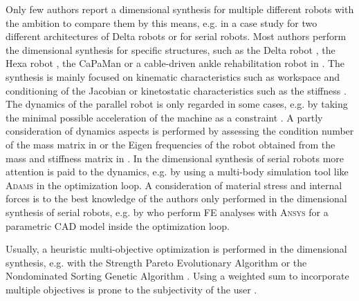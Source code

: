 \documentclass[fleqn,a4paper,10pt]{article}
\begin{document}
\begin{multicols}{2}
Only few authors report a dimensional synthesis for multiple different robots with the ambition to compare them by this means, e.g. \cite{Krefft2006} in a case study for two different architectures of Delta robots or \cite{Ramirez2018} for serial robots.
Most authors perform the dimensional synthesis for specific structures, such as the  Delta robot \cite{StockMil2003,KelaiaiaComZaa2012}, the Hexa robot \cite{Krefft2006}, the CaPaMan \cite{CarboneOttCec2007} or a cable-driven ankle rehabilitation robot in \cite{JamwalHusXie2015}.
The synthesis is mainly focused on kinematic characteristics such as workspace and conditioning of the Jacobian or kinetostatic characteristics such as the stiffness \cite{CarboneOttCec2007,KelaiaiaComZaa2012}. %
The dynamics of the parallel robot is only regarded in some cases, e.g. by taking the minimal possible acceleration of the machine as a constraint \cite{Krefft2006}.
A partly consideration of dynamics aspects is performed by assessing the condition number of the mass matrix in \cite{KelaiaiaComZaa2012} or the Eigen frequencies of the robot obtained from the mass and stiffness matrix in \cite{JamwalHusXie2015}.
In the dimensional synthesis of serial robots more attention is paid to the dynamics, e.g. by \cite{ZhouBaiHan2011} using a multi-body simulation tool like \textsc{Adams} in the optimization loop.
A consideration of material stress and internal forces is to the best knowledge of the authors only performed in the dimensional synthesis of serial robots, e.g. by \cite{ZhouBai2015} who perform FE analyses with \textsc{Ansys} for a parametric CAD model inside the optimization loop.

Usually, a heuristic multi-objective optimization is performed in the dimensional synthesis, e.g. with the Strength Pareto Evolutionary Algorithm \cite{Krefft2006,KelaiaiaComZaa2012} or the Nondominated Sorting Genetic Algorithm \cite{JamwalHusXie2015}.
Using a weighted sum to incorporate multiple objectives is prone to the subjectivity of the user \cite{Merlet2006,JamwalHusXie2015}. %



\end{multicols}
\end{document}
